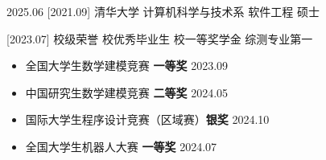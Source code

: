 \documentclass[zh]{resume}
\begin{document}
 
\makeheader 

\vspace{-1.3em} 
\begin{educations} 
  \education%
    {2025.06}%
    [2021.09]%
    {清华大学}%
    {计算机科学与技术系}%
    {软件工程}%
    {硕士} 
    
  \separator{0.7ex} 
  \education%
    {}%
    [2023.07]%
    {校级荣誉}%
    {校优秀毕业生}%
    {校一等奖学金}%
    {综测专业第一} 
  
\end{educations} 

\vspace{-1.3em} 

\begin{competences} 
\end{competences} 

\vspace{-1.3em} 
\begin{itemize} 
  \item 全国大学生数学建模竞赛 \textbf{一等奖} \hfill \textcolor{symbolcolor}{2023.09} 
  \item 中国研究生数学建模竞赛 \textbf{二等奖} \hfill \textcolor{symbolcolor}{2024.05} 
  \item 国际大学生程序设计竞赛（区域赛）\textbf{银奖} \hfill \textcolor{symbolcolor}{2024.10} 
  \item 全国大学生机器人大赛 \textbf{一等奖} \hfill \textcolor{symbolcolor}{2024.07} 
\end{itemize} 
\end{document}
